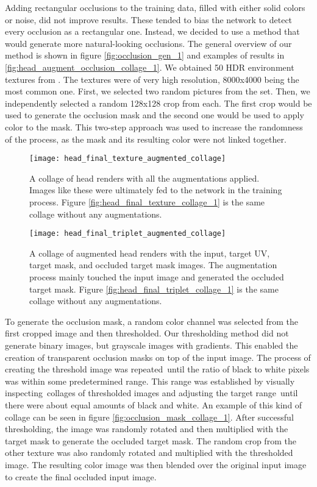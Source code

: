 Adding rectangular occlusions to the training data, filled with either solid colors or noise, did not improve results. These tended to bias the network to detect every occlusion as a rectangular one. Instead, we decided to use a method that would generate more natural-looking occlusions. The general overview of our method is shown in figure \ref{fig:occlusion_gen_1} and examples of results in \ref{fig:head_augment_occlusion_collage_1}. We obtained 50 \ac{HDR} environment textures from \textcite{sibl}. The textures were of very high resolution, 8000x4000 being the most common one. First, we selected two random pictures from the set. Then, we independently selected a random 128x128 crop from each. The first crop would be used to generate the occlusion mask and the second one would be used to apply color to the mask. This two-step approach was used to increase the randomness of the process, as the mask and its resulting color were not linked together.

\begin{figure}
    \texttt{[image: head\_final\_texture\_augmented\_collage]}
    \caption[All augmentations collage]{A collage of head renders with all the augmentations applied. Images like these were ultimately fed to the network in the training process. Figure \ref{fig:head_final_texture_collage_1} is the same collage without any augmentations.}
    \label{fig:head_final_texture_augmented_collage_1}
\end{figure}

\begin{figure}
    \texttt{[image: head\_final\_triplet\_augmented\_collage]}
    \caption[All augmentations triplet collage]{A collage of augmented head renders with the input, target UV, target mask, and occluded target mask images. The augmentation process mainly touched the input image and generated the occluded target mask. Figure \ref{fig:head_final_triplet_collage_1} is the same collage without any augmentations.}
    \label{fig:head_final_triplet_augmented_collage_1}
\end{figure}

To generate the occlusion mask, a random color channel was selected from the first cropped image and then thresholded. Our thresholding method did not generate binary images, but grayscale images with gradients. This enabled the creation of transparent occlusion masks on top of the input image. The process of creating the threshold image was repeated until the ratio of black to white pixels was within some predetermined range. This range was established by visually inspecting collages of thresholded images and adjusting the target range until there were about equal amounts of black and white. An example of this kind of collage can be seen in figure \ref{fig:occlusion_mask_collage_1}. After successful thresholding, the image was randomly rotated and then multiplied with the target mask to generate the occluded target mask. The random crop from the other texture was also randomly rotated and multiplied with the thresholded image. The resulting color image was then blended over the original input image to create the final occluded input image.

